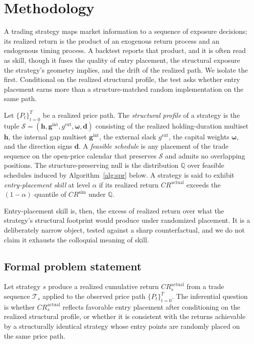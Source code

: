 \documentclass[risks,article,submit,pdftex,oneauthor]{Definitions/mdpi}
\begin{document}
\section{Methodology}

A trading strategy maps market information to a sequence of exposure decisions;
its realized return is the product of an exogenous return process and an
endogenous timing process. A backtest reports that product, and it is often read as
skill, though it fuses the quality of entry placement, the structural
exposure the strategy's geometry implies, and the drift of the realized path. We
isolate the first. Conditional on the realized structural profile, the test asks
whether entry placement earns more than a structure-matched random implementation
on the same path.

\begin{Definition}
Let $\{P_t\}_{t=0}^{T}$ be a realized price path. The \emph{structural profile} of a strategy is the tuple $\mathcal{S} = (\mathbf{h}, \mathbf{g}^{\mathrm{int}}, g^{\mathrm{ext}}, \boldsymbol{\omega}, \mathbf{d})$ consisting of the realized holding-duration multiset $\mathbf{h}$, the internal gap multiset $\mathbf{g}^{\mathrm{int}}$, the external slack $g^{\mathrm{ext}}$, the capital weights $\boldsymbol{\omega}$, and the direction signs $\mathbf{d}$. A \emph{feasible schedule} is any placement of the trade sequence on the open-price calendar that preserves $\mathcal{S}$ and admits no overlapping positions. The structure-preserving null is the distribution $\mathbb{Q}$ over feasible schedules induced by Algorithm~\ref{alg:spr} below. A strategy is said to exhibit \emph{entry-placement skill} at level $\alpha$ if its realized return $CR^{\mathrm{actual}}$ exceeds the $(1-\alpha)$ quantile of $CR^{\mathrm{sim}}$ under $\mathbb{Q}$.
\end{Definition}

Entry-placement skill is, then, the excess of realized return over what the strategy's structural footprint would produce under randomized placement. It is a deliberately narrow object, tested against a sharp counterfactual, and we do not claim it exhausts the colloquial meaning of skill.

\subsection{Formal problem statement}

Let strategy $s$ produce a realized cumulative return $CR_s^{\mathrm{actual}}$ from a trade sequence $\mathcal{T}_s$ applied to the observed price path $\{P_t\}_{t=0}^{T}$. The inferential question is whether $CR_s^{\mathrm{actual}}$ reflects favorable entry placement after conditioning on the realized structural profile, or whether it is consistent with the returns achievable by a structurally identical strategy whose entry points are randomly placed on the same price path.
\end{document}
